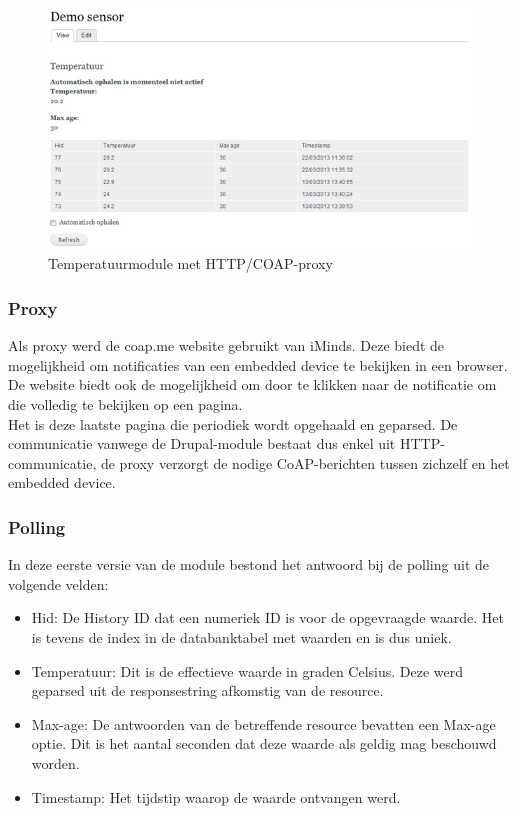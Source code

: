 \begin{figure}[h!]
\vspace{10pt}
\includegraphics[width=1\textwidth]{fig/TemperatuurModuleHTTPCOAPProxy}
\vspace{-30pt}
\caption{Temperatuurmodule met HTTP/COAP-proxy}
\vspace{-10pt}
\end{figure}

\subsubsection{Proxy}
Als proxy werd de coap.me website gebruikt van iMinds. Deze biedt de mogelijkheid om notificaties van een embedded device te bekijken in een browser. De website biedt ook de mogelijkheid om door te klikken naar de notificatie om die volledig te bekijken op een pagina.\\

Het is deze laatste pagina die periodiek wordt opgehaald en geparsed. De communicatie vanwege de Drupal-module bestaat dus enkel uit HTTP-communicatie, de proxy verzorgt de nodige CoAP-berichten tussen zichzelf en het embedded device.

\subsubsection{Polling}
In deze eerste versie van de module bestond het antwoord bij de polling uit de volgende velden:
\begin{itemize}
\item Hid: De History ID dat een numeriek ID is voor de opgevraagde waarde. Het is tevens de index in de databanktabel met waarden en is dus uniek.
\item Temperatuur: Dit is de effectieve waarde in graden Celsius. Deze werd geparsed uit de responsestring afkomstig van de resource.
\item Max-age: De antwoorden van de betreffende resource bevatten een Max-age optie. Dit is het aantal seconden dat deze waarde als geldig mag beschouwd worden.
\item Timestamp: Het tijdstip waarop de waarde ontvangen werd.
\end{itemize}

